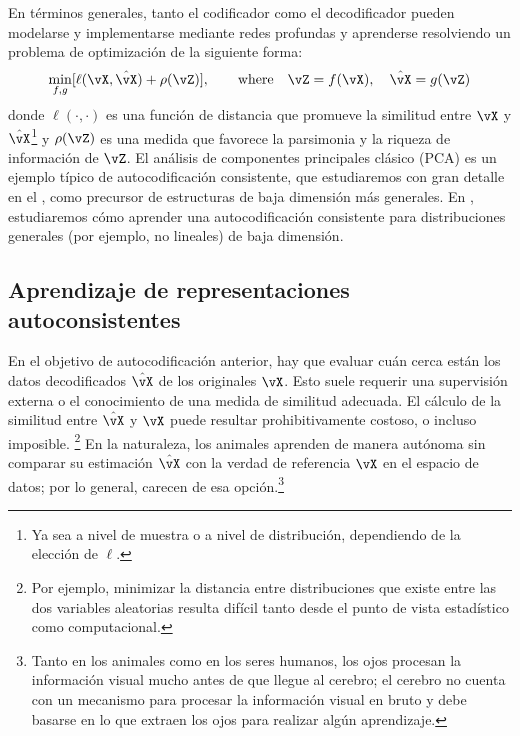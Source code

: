 \documentclass[../../book-main_es.tex]{subfiles}
\begin{document}
En términos generales, tanto el codificador como el decodificador pueden modelarse y
implementarse mediante redes profundas y aprenderse resolviendo un problema de optimización
de la siguiente forma:
\begin{equation}
    \min_{f, g} [\ell(\vX, \hat{\vX}) + \rho(\vZ)], \qquad
    \text{where} \quad \vZ = f(\vX), \quad \hat{\vX} = g(\vZ)
    \label{eqn:auto-encoding-objective}
\end{equation}
donde \(\ell(\cdot, \cdot)\) es una función de distancia que promueve
la similitud entre \(\vX\) y \(\hat{\vX}\)\footnote{Ya sea
    a nivel de muestra o a nivel de distribución, dependiendo de la elección de
\(\ell\).} y \(\rho(\vZ)\) es una medida que favorece la parsimonia y
la riqueza de información de \(\vZ\). El análisis de componentes principales
clásico (PCA) \cite{JolliffeI2002} es un ejemplo típico de
autocodificación consistente, que estudiaremos con gran detalle en el
, como precursor de estructuras de baja dimensión
más generales. En , estudiaremos cómo aprender
una autocodificación consistente para distribuciones generales (por ejemplo, no 
lineales) de baja dimensión.

\subsection{Aprendizaje de representaciones autoconsistentes}
En el objetivo de autocodificación anterior, hay que evaluar cuán cerca están los
datos decodificados \(\hat{\vX}\) de los originales \(\vX\). Esto suele
requerir una supervisión externa o el conocimiento de una medida de
similitud adecuada. El cálculo de la similitud entre \(\hat{\vX}\) y
\(\vX\) puede resultar prohibitivamente costoso, o incluso
imposible. \footnote{Por ejemplo, minimizar la distancia entre distribuciones que existe
    entre las dos variables aleatorias resulta difícil tanto desde el punto de vista estadístico como
computacional.} En la naturaleza, los animales aprenden de manera autónoma
sin comparar su estimación \(\hat{\vX}\) con la verdad de referencia
\(\vX\) en el espacio de datos; por lo general, carecen de esa
opción.\footnote{Tanto en los animales como en los seres humanos, los ojos procesan la información visual
    mucho antes de que llegue al cerebro; el cerebro no cuenta con un
    mecanismo para procesar la información visual en bruto y debe basarse en lo que
    extraen los ojos para realizar algún aprendizaje.}
\end{document}

